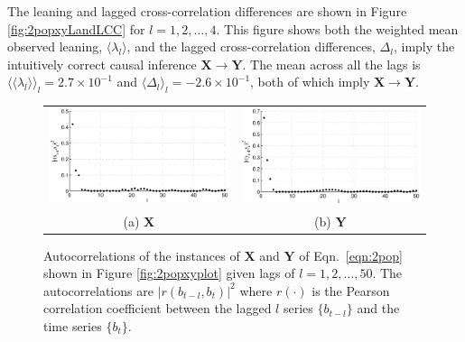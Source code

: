 The leaning and lagged cross-correlation differences are shown in Figure \ref{fig:2popxyLandLCC} for $l=1,2,\ldots,4$.  This figure shows both the weighted mean observed leaning, $\langle \lambda_l\rangle$, and the lagged cross-correlation differences, $\Delta_l$, imply the intuitively correct causal inference $\mathbf{X}\rightarrow\mathbf{Y}$.  The mean across all the lags is $\langle\langle\lambda_l\rangle\rangle_l=2.7\times 10^{-1}$ and $\langle\Delta_l\rangle_l=-2.6\times 10^{-1}$, both of which imply $\mathbf{X}\rightarrow\mathbf{Y}$.  
\begin{figure}[ht]
\begin{tabular}{cc}
\includegraphics[scale=0.48]{CoupLogMapExample_autocorrX.eps} & \includegraphics[scale=0.48]{CoupLogMapExample_autocorrY.eps} \\
(a) $\mathbf{X}$ & (b) $\mathbf{Y}$
\end{tabular}
\caption{Autocorrelations of the instances of $\mathbf{X}$ and $\mathbf{Y}$ of Eqn.\ \ref{eqn:2pop} shown in Figure \ref{fig:2popxyplot} given lags of $l=1,2,\ldots,50$.  The autocorrelations are $|r(b_{t-l},b_t)|^2$ where $r(\cdot)$ is the Pearson correlation coefficient between the lagged $l$ series $\{b_{t-l}\}$ and the time series $\{b_{t}\}$.}
\label{fig:2popxyautocorr}
\end{figure}
